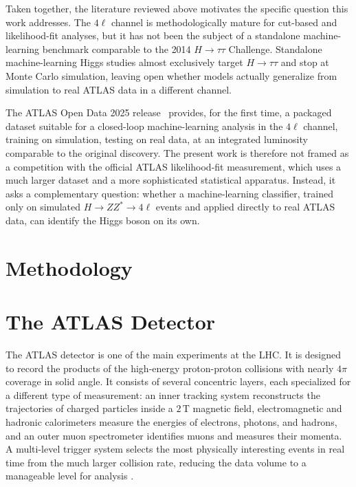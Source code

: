 \documentclass[conference]{IEEEtran}
\begin{document}
{Taken together, the literature reviewed above motivates the specific question this work addresses. The $4\ell$ channel is methodologically mature for cut-based and likelihood-fit analyses, but it has not been the subject of a standalone machine-learning benchmark comparable to the 2014 $H \rightarrow \tau\tau$ Challenge. Standalone machine-learning Higgs studies almost exclusively target $H \rightarrow \tau\tau$ and stop at Monte Carlo simulation, leaving open whether models actually generalize from simulation to real ATLAS data in a different channel.
 
The ATLAS Open Data 2025 release~\cite{atlas2025opendata} provides, for the first time, a packaged dataset suitable for a closed-loop machine-learning analysis in the $4\ell$ channel, training on simulation, testing on real data, at an integrated luminosity comparable to the original discovery. The present work is therefore not framed as a competition with the official ATLAS likelihood-fit measurement, which uses a much larger dataset and a more sophisticated statistical apparatus. Instead, it asks a complementary question: whether a machine-learning classifier, trained only on simulated $H \rightarrow ZZ^{*} \rightarrow 4\ell$ events and applied directly to real ATLAS data, can identify the Higgs boson on its own.

\section*{Methodology}

\section{The ATLAS Detector}
The ATLAS detector is one of the main experiments at the LHC. It is designed to record the products of the high-energy proton-proton collisions with nearly \(4\pi\) coverage in solid angle. It consists of several concentric layers, each specialized for a different type of measurement: an inner tracking system reconstructs the trajectories of charged particles inside a \(2 \, \mathrm{T}\) magnetic field, electromagnetic and hadronic calorimeters measure the energies of electrons, photons, and hadrons, and an outer muon spectrometer identifies muons and measures their momenta. A multi-level trigger system selects the most physically interesting events in real time from the much larger collision rate, reducing the data volume to a manageable level for analysis \cite{atlas2018higgsmass}.

}
\end{document}
